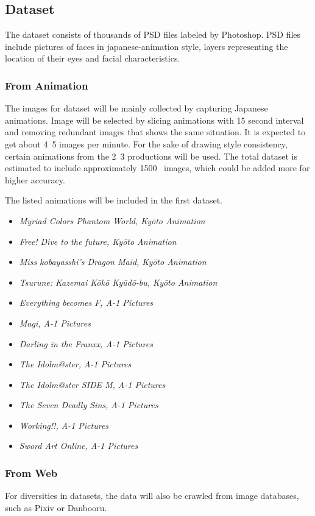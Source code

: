\documentclass{article}
\begin{document}
\subsection{Dataset}
The dataset consists of thousands of PSD files labeled by Photoshop. PSD files include pictures of faces in japanese-animation style, layers representing the location of their eyes and facial characteristics.

\subsubsection{From Animation}
The images for dataset will be mainly collected by capturing Japanese animations.
Image will be selected by slicing animations with 15 second interval and removing redundant images that shows the same situation. It is expected to get about 4~5 images per minute.
For the sake of drawing style consistency, certain animations from the 2~3 productions will be used. The total dataset is estimated to include approximately 1500~ images, which could be added more for higher accuracy.

The listed animations will be included in the first dataset.
\begin{itemize}
\item \textit{Myriad Colors Phantom World, Kyōto Animation}
\item \textit{Free! Dive to the future, Kyōto Animation}
\item \textit{Miss kobayasshi's Dragon Maid, Kyōto Animation}
\item \textit{Tsurune: Kazemai Kōkō Kyūdō-bu, Kyōto Animation}

\item \textit{Everything becomes F, A-1 Pictures}
\item \textit{Magi, A-1 Pictures}
\item \textit{Darling in the Franxx, A-1 Pictures}
\item \textit{The Idolm@ster, A-1 Pictures}
\item \textit{The Idolm@ster SIDE M, A-1 Pictures}
\item \textit{The Seven Deadly Sins, A-1 Pictures}
\item \textit{Working!!, A-1 Pictures}
\item \textit{Sword Art Online, A-1 Pictures}
\end{itemize}

\subsubsection{From Web}
For diversities in datasets, the data will also be crawled from image databases, such as Pixiv or Danbooru.
\end{document}
